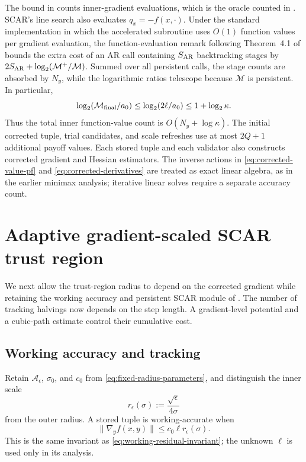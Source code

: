 \documentclass{article}
\begin{document}
\begin{remark}
The bound in  counts
inner-gradient evaluations, which is the oracle counted in
.  SCAR's line search also evaluates
$q_x=-f(x,\cdot)$.  Under the standard implementation in which the
accelerated subroutine uses $O(1)$ function values per gradient
evaluation, the function-evaluation remark following Theorem~4.1 of
\citet{lan2026optimal} bounds the extra cost of an AR call containing
$S_{\rm AR}$ backtracking stages by
$2S_{\rm AR}+\log_2(\mathcal M^+/\mathcal M)$.  Summed over all
persistent calls, the stage counts are absorbed by $N_y$, while the
logarithmic ratios telescope because $\mathcal M$ is persistent.  In
particular,
\[
 \log_2(\mathcal M_{\rm final}/a_0)
 \le\log_2(2\ell/a_0)\le1+\log_2\kappa.
\]
Thus the total inner function-value count is
$O(N_y+\log\kappa)$.  The initial corrected tuple, trial candidates,
and scale refreshes use at most $2Q+1$ additional payoff values.
Each stored tuple and each validator also constructs corrected
gradient and Hessian estimators.  The inverse actions in
\eqref{eq:corrected-value-pf} and
\eqref{eq:corrected-derivatives} are treated as exact linear algebra,
as in the earlier minimax analysis; iterative linear solves require a
separate accuracy count.
\end{remark}

\section{Adaptive gradient-scaled SCAR trust region}
\label{sec:pf-gradient-scaled}

We next allow the trust-region radius to depend on the corrected
gradient while retaining the working accuracy and persistent SCAR
module of .  The number of tracking halvings
now depends on the step length.  A gradient-level potential and a
cubic-path estimate control their cumulative cost.

\subsection{Working accuracy and tracking}

Retain $\mathcal A_\epsilon$, $\sigma_0$, and $c_0$ from
\eqref{eq:fixed-radius-parameters}, and distinguish the inner scale
\[
 r_\epsilon(\sigma):=\frac{\sqrt\epsilon}{4\sigma}
\]
from the outer radius.  A stored tuple is working-accurate when
\begin{equation}\label{eq:gs-working-invariant}
 \|\nabla_yf(x,y)\|\le c_0\ell r_\epsilon(\sigma).
\end{equation}
This is the same invariant as \eqref{eq:working-residual-invariant};
the unknown $\ell$ is used only in its analysis.
\end{document}

